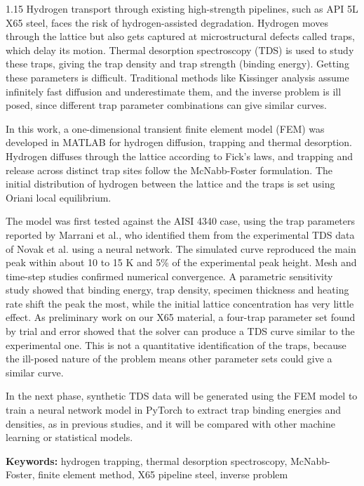 \documentclass[a4paper,12pt,oneside]{report}
\begin{document}
\begin{spacing}{1.15}
Hydrogen transport through existing high-strength pipelines, such as API 5L X65 steel, faces the risk of hydrogen-assisted degradation. Hydrogen moves through the lattice but also gets captured at microstructural defects called traps, which delay its motion. Thermal desorption spectroscopy (TDS) is used to study these traps, giving the trap density and trap strength (binding energy). Getting these parameters is difficult. Traditional methods like Kissinger analysis assume infinitely fast diffusion and underestimate them, and the inverse problem is ill posed, since different trap parameter combinations can give similar curves.

In this work, a one-dimensional transient finite element model (FEM) was developed in MATLAB for hydrogen diffusion, trapping and thermal desorption. Hydrogen diffuses through the lattice according to Fick's laws, and trapping and release across distinct trap sites follow the McNabb-Foster formulation. The initial distribution of hydrogen between the lattice and the traps is set using Oriani local equilibrium.

The model was first tested against the AISI 4340 case, using the trap parameters reported by Marrani et al.\cite{Marrani2025}, who identified them from the experimental TDS data of Novak et al.\cite{Novak2010} using a neural network. The simulated curve reproduced the main peak within about 10 to 15 K and 5\% of the experimental peak height. Mesh and time-step studies confirmed numerical convergence. A parametric sensitivity study showed that binding energy, trap density, specimen thickness and heating rate shift the peak the most, while the initial lattice concentration has very little effect. As preliminary work on our X65 material, a four-trap parameter set found by trial and error showed that the solver can produce a TDS curve similar to the experimental one. This is not a quantitative identification of the traps, because the ill-posed nature of the problem means other parameter sets could give a similar curve.

In the next phase, synthetic TDS data will be generated using the FEM model to train a neural network model in PyTorch to extract trap binding energies and densities, as in previous studies, and it will be compared with other machine learning or statistical models.

\vspace{1.2em}
\noindent\textbf{Keywords:} hydrogen trapping, thermal desorption spectroscopy, McNabb-Foster, finite element method, X65 pipeline steel, inverse problem
\end{spacing}
\end{document}
